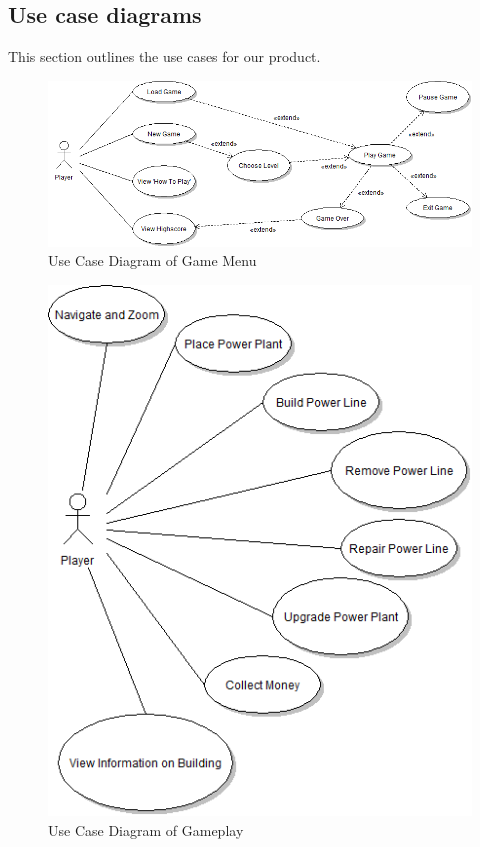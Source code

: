 \subsection{Use case diagrams}

This section outlines the use cases for our product.

\begin{figure}[H]
  	\centering
	\includegraphics[scale=0.45]{pictures/UCD_Menu.png}
	\caption{Use Case Diagram of Game Menu}
\end{figure}

\begin{figure}[H]
  	\centering
	\includegraphics[scale=0.5]{pictures/UCD_PlayGame.png}
	\caption{Use Case Diagram of Gameplay}
\end{figure}

